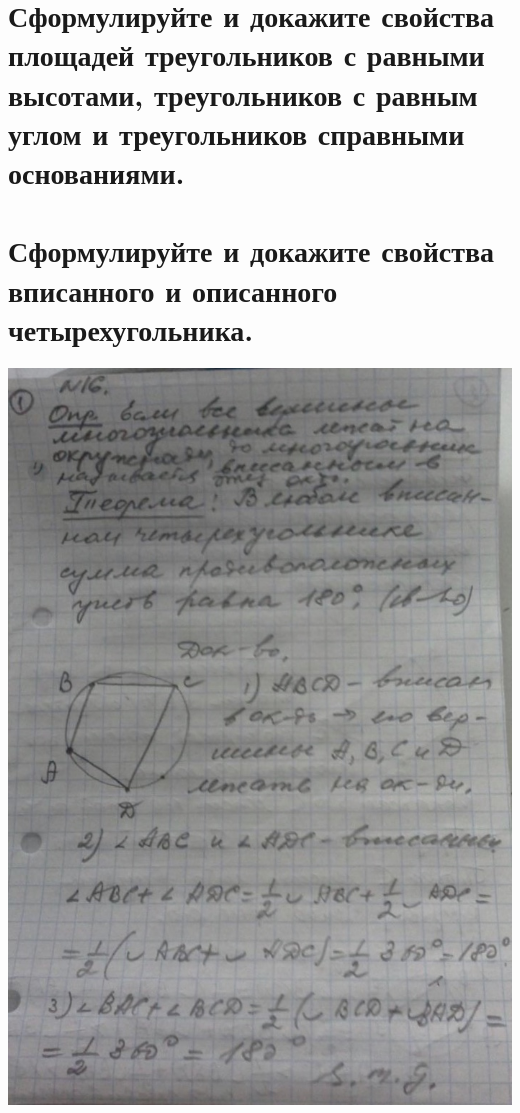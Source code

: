 \documentclass[12pt, letterpaper]{article}
\begin{document}
\section {Сформулируйте и докажите свойства площадей треугольников с равными высотами, треугольников с равным углом и треугольников справными основаниями.}
\section {Сформулируйте и докажите свойства вписанного и описанного четырехугольника.}
\includegraphics[scale=0.3]{solve16.jpg} \\
\end{document}
